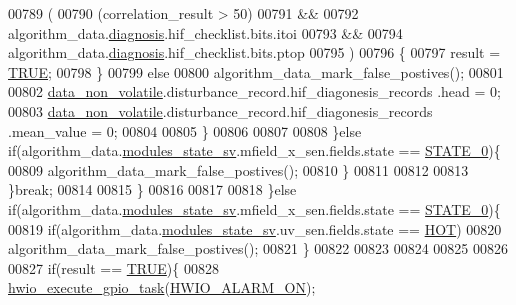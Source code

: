 \begin{DoxyCode}
{{{{{00789                                  (
00790                                  (correlation\_result > 50)
00791                                  &&
00792                                  algorithm\_data.\hyperlink{a00016_a16f85d57ec98b4ad05f5a2e10536b3c6}{diagnosis}.hif\_checklist.bits.itoi
00793                                  &&
00794                                  algorithm\_data.\hyperlink{a00016_a16f85d57ec98b4ad05f5a2e10536b3c6}{diagnosis}.hif\_checklist.bits.ptop
00795                                  )
00796                                 \{
00797                                   result = \hyperlink{a00040_aa8cecfc5c5c054d2875c03e77b7be15d}{TRUE};
00798                                 \}
00799                                  \textcolor{keywordflow}{else}
00800                                 algorithm\_data\_mark\_false\_postives();
00801 
00802                                \hyperlink{a00060_a76ac5f917f5308dcd83de0d7c94559fb}{data\_non\_volatile}.disturbance\_record.hif\_diagonesis\_records
      .head = 0;
00803                                \hyperlink{a00060_a76ac5f917f5308dcd83de0d7c94559fb}{data\_non\_volatile}.disturbance\_record.hif\_diagonesis\_records
      .mean\_value = 0;
00804 
00805                            \}
00806 
00807                                     
00808                       \}\textcolor{keywordflow}{else} \textcolor{keywordflow}{if}(algorithm\_data.\hyperlink{a00016_a293140e240bbd54f7601adbc9194148c}{modules\_state\_sv}.mfield\_x\_sen.fields.state ==
       \hyperlink{a00021_ad6739dbbe5581cac99b7dc8a5e09949c}{STATE\_0})\{
00809                             algorithm\_data\_mark\_false\_postives();
00810                       \} 
00811                        
00812 
00813                 \}\textcolor{keywordflow}{break};
00814 
00815         \}
00816 
00817 
00818         \}\textcolor{keywordflow}{else} \textcolor{keywordflow}{if}(algorithm\_data.\hyperlink{a00016_a293140e240bbd54f7601adbc9194148c}{modules\_state\_sv}.mfield\_x\_sen.fields.state == 
      \hyperlink{a00021_ad6739dbbe5581cac99b7dc8a5e09949c}{STATE\_0})\{
00819             \textcolor{keywordflow}{if}(algorithm\_data.\hyperlink{a00016_a293140e240bbd54f7601adbc9194148c}{modules\_state\_sv}.uv\_sen.fields.state == 
      \hyperlink{a00021_a1eb14cc432874ddacd1934791dbe12a3}{HOT})
00820             algorithm\_data\_mark\_false\_postives();
00821         \}
00822         
00823         
00824         
00825 
00826 
00827         \textcolor{keywordflow}{if}(result == \hyperlink{a00040_aa8cecfc5c5c054d2875c03e77b7be15d}{TRUE})\{
00828             \hyperlink{a00058_a0af9eae455fbdf4e77def5bfffa109cb}{hwio\_execute\_gpio\_task}(\hyperlink{a00058_abcbef2f48463bed54ae1c045303dbab8}{HWIO\_ALARM\_ON});
}}}}}
\end{DoxyCode}
